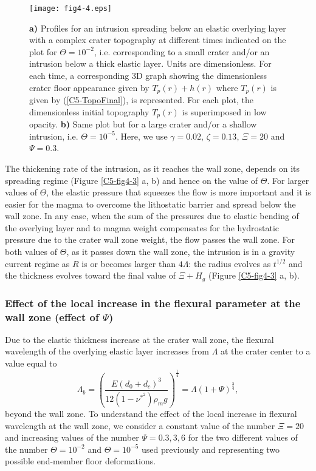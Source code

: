 \begin{figure}[h!]
  \graphicspath{ {/Users/thorey/Documents/These/Submission/Article/FFC_JGR_2013/Paper_APRES_2nd_REVIEW/} }
  \centering
  \noindent\texttt{[image: fig4-4.eps]}
  \caption{ \textbf{a) } Profiles for  an intrusion spreading below an
    elastic  overlying  layer  with  a complex  crater  topography  at
    different times  indicated on the plot  for $\Theta=10^{-2}$, i.e.
    corresponding to a small crater  and/or an intrusion below a thick
    elastic  layer.   Units  are  dimensionless.   For  each  time,  a
    corresponding  3D graph  showing  the  dimensionless crater  floor
    appearance  given  by $T_p(r)+h(r)$  where  $T_p(r)$  is given  by
    (\ref{C5-TopoFinal}),   is  represented.    For  each   plot,  the
    dimensionless initial  topography $T_p(r)$ is superimposed  in low
    opacity. \textbf{b)}  Same plot  but for a  large crater  and/or a
    shallow   intrusion,  i.e.    $\Theta=10^{-5}$.    Here,  we   use
    $\gamma=0.02$, $\zeta=0.13$, $\Xi=20$ and $\Psi=0.3$.}
  \label{C5-fig4-4}
\end{figure}

		 
The thickening  rate of the  intrusion, as  it reaches the  wall zone,
depends  on its  spreading regime  (Figure \ref{C5-fig4-3}  a, b)  and
hence on  the value of  $\Theta$. For  larger values of  $\Theta$, the
elastic pressure  that squeezes the flow  is more important and  it is
easier for  the magma to  overcome the lithostatic barrier  and spread
below the wall zone.   In any case, when the sum  of the pressures due
to  elastic  bending  of  the  overlying layer  and  to  magma  weight
compensates for the  hydrostatic pressure due to the  crater wall zone
weight, the flow passes the wall zone. For both values of $\Theta$, as
it passes  down the wall zone,  the intrusion is in  a gravity current
regime as $R$ is or becomes larger than $4\Lambda$: the radius evolves
as  $t^{1/2}$ and  the thickness  evolves  toward the  final value  of
$\Xi + H_g$ (Figure \ref{C5-fig4-3} a, b).
	
\subsubsection{Effect of the local  increase in the flexural parameter
  at the wall zone (effect of $\Psi$)}
		
Due to  the elastic thickness  increase at  the crater wall  zone, the
flexural  wavelength of  the  overlying elastic  layer increases  from
$\Lambda$ at the crater center to a value equal to
\begin{equation}
  \Lambda_{b}=\left( \frac{E(d_0+d_c)^3}{12(1-\nu^*^2)\rho_m g}\right)^{\frac{1}{4}} = \Lambda (1+\Psi)^{\frac{3}{4}},
\end{equation}
beyond the wall  zone. To understand the effect of  the local increase
in flexural wavelength at the wall  zone, we consider a constant value
of  the   number  $\Xi=20$  and   increasing  values  of   the  number
$\Psi=0.3,3,6$   for  the   two   different  values   of  the   number
$\Theta=10^{-2}$ and $\Theta=10^{-5}$ used previously and representing
two possible end-member floor deformations.
		
